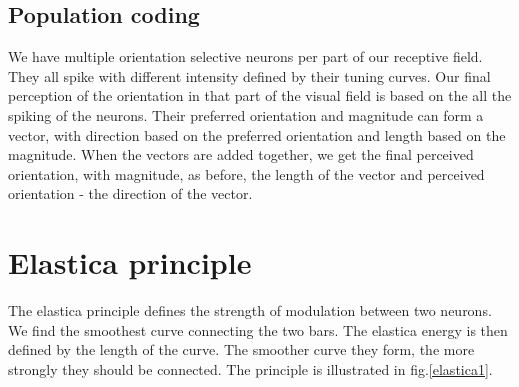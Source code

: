 

\subsection{Population coding}

We have multiple orientation selective neurons per part of our receptive field. They all spike with different intensity defined by their tuning curves. Our final perception of the orientation in that part of the visual field is based on the all the spiking of the neurons. Their preferred orientation and magnitude can form a vector, with direction based on the preferred orientation and length based on the magnitude. When the vectors are added together, we get the final perceived orientation, with magnitude, as before, the length of the vector and perceived orientation - the direction of the vector.


\section{Elastica principle}

The elastica principle defines the strength of modulation between two neurons. We find the smoothest curve connecting the two bars. The elastica energy is then defined by the length of the curve. The smoother curve they form, the more strongly they should be connected. The principle is illustrated in fig.\ref{elastica1}.





